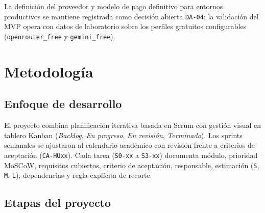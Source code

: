\documentclass[12pt,a4paper]{article}
\begin{document}
La definición del proveedor y modelo de pago definitivo para entornos productivos se mantiene registrada como decisión abierta \texttt{DA-04}; la validación del MVP opera con datos de laboratorio sobre los perfiles gratuitos configurables (\texttt{openrouter\_free} y \texttt{gemini\_free}).

\section{Metodología}

\subsection{Enfoque de desarrollo}

El proyecto combina planificación iterativa basada en Scrum \cite{schwaber-scrum} con gestión visual en tablero Kanban (\textit{Backlog}, \textit{En progreso}, \textit{En revisión}, \textit{Terminado}). Los sprints semanales se ajustaron al calendario académico con revisión frente a criterios de aceptación (\texttt{CA-HUxx}). Cada tarea (\texttt{S0-xx} a \texttt{S3-xx}) documenta módulo, prioridad MoSCoW, requisitos cubiertos, criterio de aceptación, responsable, estimación (\texttt{S}, \texttt{M}, \texttt{L}), dependencias y regla explícita de recorte.

\subsection{Etapas del proyecto}
\end{document}
